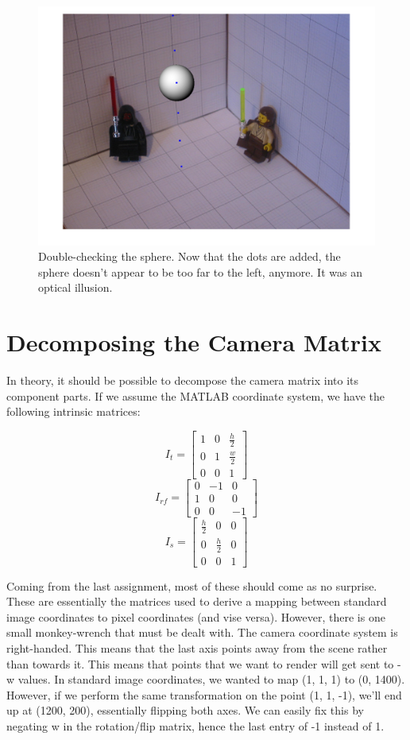 \documentclass{article}
\begin{document}
\begin{figure}[!ht]
	\centering
	\includegraphics[width=120mm]{figs/sphere_dbl_check.png}
	\caption{Double-checking the sphere. Now that the dots are added, the sphere 
        doesn't appear to be too far to the left, anymore. It was an optical 
        illusion.}
\end{figure}

\section{Decomposing the Camera Matrix}

In theory, it should be possible to decompose the camera matrix into its 
component parts. If we assume the MATLAB coordinate system, we have the following 
intrinsic matrices:

$$
I_t = 
\begin{bmatrix}
1 & 0 & \frac{h}{2} \\
0 & 1 & \frac{w}{2} \\
0 & 0 & 1
\end{bmatrix}
$$
$$
I_{rf} = 
\begin{bmatrix}
0 & -1 &  0 \\
1 &  0 &  0 \\
0 &  0 & -1
\end{bmatrix}
$$
$$
I_s = 
\begin{bmatrix}
\frac{h}{2} &           0 & 0 \\
0           & \frac{h}{2} & 0 \\
0           &           0 & 1
\end{bmatrix}
$$

Coming from the last assignment, most of these should come as no surprise. These 
are essentially the matrices used to derive a mapping between standard image 
coordinates to pixel coordinates (and vise versa).
However, there is one small monkey-wrench that must be dealt with. The camera 
coordinate system is right-handed. This means that the last axis points away 
from the scene rather than towards it. This means that points that we want to 
render will get sent to -w values. In standard image coordinates, we wanted to 
map (1, 1, 1) to (0, 1400). However, if we perform the same transformation on 
the point (1, 1, -1), we'll end up at (1200, 200), essentially flipping both 
axes. We can easily fix this by negating w in the rotation/flip matrix, hence 
the last entry of -1 instead of 1.
\end{document}

